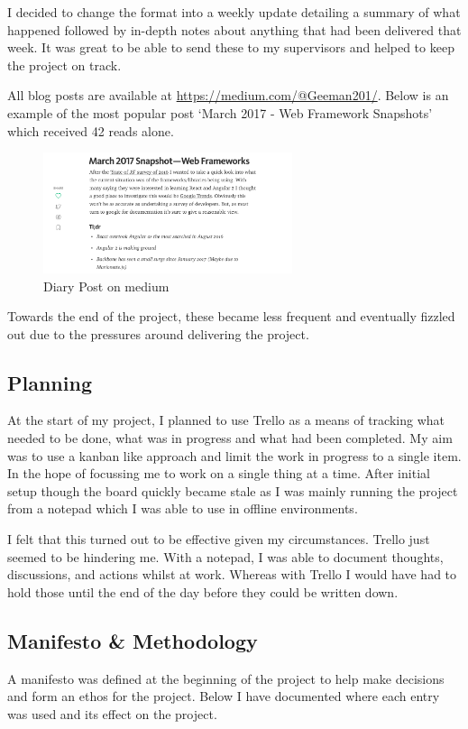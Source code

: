 I decided to change the format into a weekly update
detailing a summary of what happened followed by in-depth notes about
anything that had been delivered that week. It was great to be able to send
these to my supervisors and helped to keep the project on track.

All blog posts are available at \url{https://medium.com/@Geeman201/}. Below
is an example of the most popular post `March 2017 - Web Framework Snapshots'
which received 42 reads alone.

\begin{figure}[H]
\centering
\includegraphics[width=0.65\textwidth]{figures/medium_example}
\captionsetup{justification=centering}
\caption{Diary Post on medium
\label{fig:medium_example}}
\end{figure}

Towards the end of the project, these became less frequent and eventually
fizzled out due to the pressures around delivering the project.



\subsection{Planning}
At the start of my project, I planned to use Trello as a means of tracking what
needed to be done, what was in progress and what had been completed. My aim was
to use a kanban like approach and limit the work in progress to a single item.
In the hope of focussing me to work on a single thing at a time. After
initial setup though the board quickly became stale as I was mainly running
the project from a notepad which I was able to use in offline environments.

I felt that this turned out to be effective given my circumstances. Trello
just seemed to be hindering me. With a notepad, I was able to
document thoughts, discussions, and actions whilst at work. Whereas with
Trello I would have had to hold those until the end of the day before they
could be written down.

\subsection{Manifesto \& Methodology}
A manifesto was defined at the beginning of the project to help make
decisions and form an ethos for the project. Below I have documented where
each entry was used and its effect on the project.

